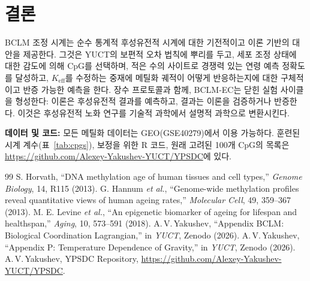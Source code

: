 \documentclass[12pt,a4paper]{article}
\begin{document}
	\section{결론}
	\label{sec:conclusion}
	BCLM 조정 시계는 순수 통계적 후성유전적 시계에 대한 기전적이고 이론 기반의 대안을 제공한다. 그것은 YUCT의 보편적 오차 법칙에 뿌리를 두고, 세포 조정 상태에 대한 감도에 의해 CpG를 선택하며, 적은 수의 사이트로 경쟁력 있는 연령 예측 정확도를 달성하고, \(K_{\mathrm{eff}}\)를 수정하는 중재에 메틸화 궤적이 어떻게 반응하는지에 대한 구체적이고 반증 가능한 예측을 한다. 장수 프로토콜과 함께, BCLM-EC는 닫힌 실험 사이클을 형성한다: 이론은 후성유전적 결과를 예측하고, 결과는 이론을 검증하거나 반증한다. 이것은 후성유전적 노화 연구를 기술적 과학에서 설명적 과학으로 변환시킨다.
	
	\vspace{0.5cm}
	\noindent\textbf{데이터 및 코드:} 모든 메틸화 데이터는 GEO(GSE40279)에서 이용 가능하다. 훈련된 시계 계수(표~\ref{tab:cpgs}), 보정을 위한 R 코드, 원래 고려된 100개 CpG의 목록은 \url{https://github.com/Alexey-Yakushev-YUCT/YPSDC}에 있다.
	
	\begin{thebibliography}{99}
		 S. Horvath, ``DNA methylation age of human tissues and cell types,'' \emph{Genome Biology}, 14, R115 (2013).
		 G. Hannum \emph{et al.}, ``Genome-wide methylation profiles reveal quantitative views of human ageing rates,'' \emph{Molecular Cell}, 49, 359--367 (2013).
		 M. E. Levine \emph{et al.}, ``An epigenetic biomarker of ageing for lifespan and healthspan,'' \emph{Aging}, 10, 573--591 (2018).
		 A.\,V.\,Yakushev, ``Appendix BCLM: Biological Coordination Lagrangian,'' in \emph{YUCT}, Zenodo (2026).
		 A.\,V.\,Yakushev, ``Appendix P: Temperature Dependence of Gravity,'' in \emph{YUCT}, Zenodo (2026).
		 A.\,V.\,Yakushev, YPSDC Repository, \url{https://github.com/Alexey-Yakushev-YUCT/YPSDC}.
	\end{thebibliography}
	
\end{document}
